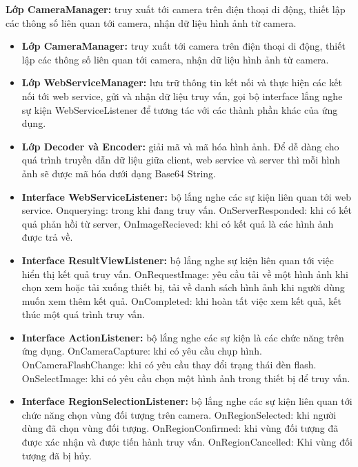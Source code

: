 \textbf{Lớp CameraManager:} truy xuất tới camera trên điện thoại di động, thiết lập các thông số liên quan tới camera, nhận dữ liệu hình ảnh từ camera.
\begin{itemize}
\item \textbf{Lớp CameraManager:} truy xuất tới camera trên điện thoại di động, thiết lập các thông số liên quan tới camera, nhận dữ liệu hình ảnh từ camera.

\item \textbf{Lớp WebServiceManager:} lưu trữ thông tin kết nối và thực hiện các kết nối tới web service, gửi và nhận dữ liệu truy vấn, gọi bộ interface lắng nghe sự kiện WebServiceListener để tương tác với các thành phần khác của ứng dụng.

\item \textbf{Lớp Decoder và Encoder:} giải mã và mã hóa hình ảnh. Để dễ dàng cho quá trình truyền dẫn dữ liệu giữa client, web service và server thì mỗi hình ảnh sẽ được mã hóa dưới dạng Base64 String.

\item \textbf{Interface WebServiceListener:} bộ lắng nghe các sự kiện liên quan tới web service. Onquerying: trong khi đang truy vấn. OnServerResponded: khi có kết quả phản hồi từ server, OnImageRecieved: khi có kết quả là các hình ảnh được trả về.

\item \textbf{Interface ResultViewListener:} bộ lắng nghe sự kiện liên quan tới việc hiển thị kết quả truy vấn. OnRequestImage: yêu cầu tải về một hình ảnh khi chọn xem hoặc tải xuống thiết bị, tải về danh sách hình ảnh khi người dùng muốn xem thêm kết quả. OnCompleted: khi hoàn tất việc xem kết quả, kết thúc một quá trình truy vấn.

\item \textbf{Interface ActionListener:} bộ lắng nghe các sự kiện là các chức năng trên ứng dụng. OnCameraCapture: khi có yêu cầu chụp hình. OnCameraFlashChange: khi có yêu cầu thay đổi trạng thái đèn flash. OnSelectImage: khi có yêu cầu chọn một hình ảnh trong thiết bị để truy vấn.

\item \textbf{Interface RegionSelectionListener:} bộ lắng nghe các sự kiện liên quan tới chức năng chọn vùng đối tượng trên camera. OnRegionSelected: khi người dùng đã chọn vùng đối tượng. OnRegionConfirmed: khi vùng đối tượng đã được xác nhận và được tiến hành truy vấn. OnRegionCancelled: Khi vùng đối tượng đã bị hủy.


\end{itemize}
